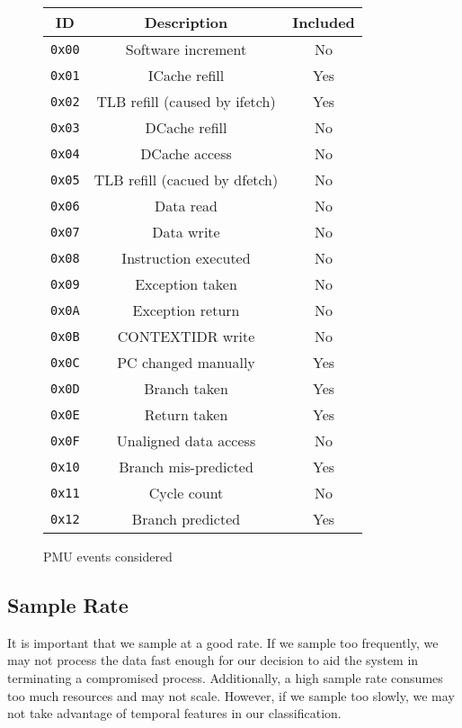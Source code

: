 \documentclass[letterpaper,twocolumn,10pt]{article}
\begin{document}
\begin{figure}
\begin{center}
\begin{tabular}{ |c|c|c| } 
\hline
ID & Description & Included \\
\hline
\texttt{0x00} & Software increment & No \\ 
\texttt{0x01} & ICache refill & Yes \\ 
\texttt{0x02} & TLB refill (caused by ifetch) & Yes \\ 
\texttt{0x03} & DCache refill & No \\ 
\texttt{0x04} & DCache access & No \\ 
\texttt{0x05} & TLB refill (cacued by dfetch) & No \\ 
\texttt{0x06} & Data read & No \\ 
\texttt{0x07} & Data write & No \\ 
\texttt{0x08} & Instruction executed & No \\ 
\texttt{0x09} & Exception taken & No \\ 
\texttt{0x0A} & Exception return & No \\ 
\texttt{0x0B} & CONTEXTIDR write & No \\ 
\texttt{0x0C} & PC changed manually & Yes \\ 
\texttt{0x0D} & Branch taken & Yes \\ 
\texttt{0x0E} & Return taken & Yes \\ 
\texttt{0x0F} & Unaligned data access & No \\ 
\texttt{0x10} & Branch mis-predicted & Yes \\ 
\texttt{0x11} & Cycle count & No \\ 
\texttt{0x12} & Branch predicted & Yes \\ 
\hline
\end{tabular}
\end{center}
\caption{PMU events considered}
\label{fig:events}
\end{figure}

\subsection*{Sample Rate}

It is important that we sample at a good rate. If we sample too frequently, we may not process 
the data fast enough for our decision to aid the system in terminating a compromised process. 
Additionally, a high sample rate consumes too much resources and may not scale. However, if 
we sample too slowly, we may not take advantage of temporal features in our classification.
\end{document}
